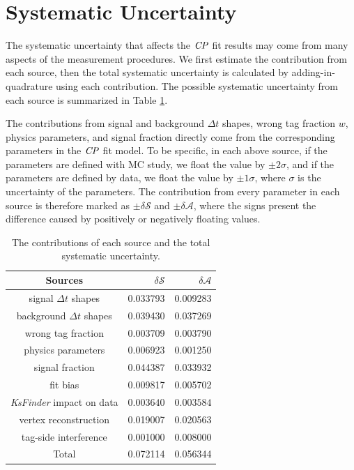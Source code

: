 \section{Systematic Uncertainty}
The systematic uncertainty that affects the $\it{CP}$ fit results may come from many aspects of the measurement procedures. We first estimate the contribution from each source, then the total systematic uncertainty  is calculated by adding-in-quadrature using each contribution. The possible systematic uncertainty from each source is summarized in Table \ref{tab:sy_sub}. 

The contributions from signal and background $\Delta t$ shapes, wrong tag fraction $w$, physics parameters, and signal fraction directly come from the corresponding parameters in the $\it{CP}$ fit model. To be specific, in each above source, if the parameters are defined with MC study, we float the value by $\pm 2 \sigma$, and if the parameters are defined by data, we float the value by $\pm 1 \sigma$, where $\sigma$ is the uncertainty of the parameters. The contribution from every parameter in each source is therefore marked as $\pm \delta \mathcal{S}$ and $\pm \delta \mathcal{A}$, where the signs present the difference caused by positively or negatively floating values. 

\begin{table}[H]
	\centering
	\caption{The contributions of each source and the total systematic uncertainty.  }
	\label{tab:sy_sub}
	\begin{tabular}{c|r|r} 
		\hline
		Sources &  $\delta \mathcal{S}$ & $\delta \mathcal{A}$\\
		\hline
		signal $\Delta t$ shapes & 0.033793 & 0.009283 \\
		background $\Delta t$ shapes & 0.039430 & 0.037269\\
		wrong tag fraction & 0.003709 & 0.003790\\
		physics parameters & 0.006923 & 0.001250\\ 
		signal fraction  & 0.044387 & 0.033932 \\
		fit bias & 0.009817 & 0.005702 \\
		\textit{KsFinder} impact on data & $0.003640$ & $0.003584$\\
		vertex reconstruction & 0.019007 & 0.020563\\
		tag-side interference & 0.001000 & 0.008000\\
		\hline
		Total & 0.072114 & 0.056344\\
		\hline
	\end{tabular}
\end{table}

